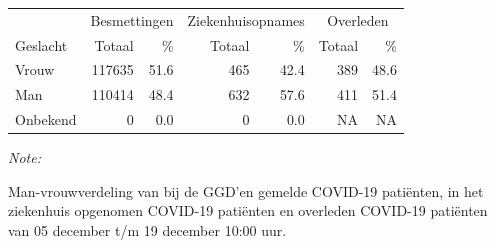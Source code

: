 \documentclass[
  english,
  man,floatsintext]{apa6}
\begin{document}
\begin{table}
\centering\begingroup\fontsize{11}{13}\selectfont

\begin{threeparttable}
\begin{tabular}{lrrrrrr}
\toprule
\multicolumn{1}{c}{ } & \multicolumn{2}{c}{Besmettingen} & \multicolumn{2}{c}{Ziekenhuisopnames} & \multicolumn{2}{c}{Overleden} \\
\cmidrule(l{3pt}r{3pt}){2-3} \cmidrule(l{3pt}r{3pt}){4-5} \cmidrule(l{3pt}r{3pt}){6-7}
Geslacht & Totaal & \% & Totaal & \% & Totaal & \%\\
\midrule
Vrouw & 117635 & 51.6 & 465 & 42.4 & 389 & 48.6\\
Man & 110414 & 48.4 & 632 & 57.6 & 411 & 51.4\\
Onbekend & 0 & 0.0 & 0 & 0.0 & NA & NA\\
\bottomrule
\end{tabular}
\begin{tablenotes}
\item \textit{Note: } 
\item Man-vrouwverdeling van bij de GGD’en gemelde COVID-19 patiënten, in het ziekenhuis opgenomen COVID-19 patiënten en overleden COVID-19 patiënten van 05 december t/m 19 december 10:00 uur.
\end{tablenotes}
\end{threeparttable}
\endgroup{}
\end{table}
\newpage
\end{document}
